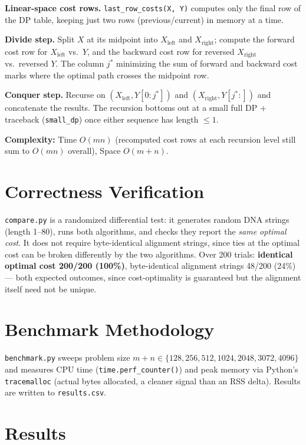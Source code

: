 \documentclass[11pt]{article}
\begin{document}
\textbf{Linear-space cost rows.} \texttt{last\_row\_costs(X, Y)} computes only
the final row of the DP table, keeping just two rows (previous/current) in
memory at a time.

\textbf{Divide step.} Split $X$ at its midpoint into $X_{\text{left}}$ and
$X_{\text{right}}$; compute the forward cost row for $X_{\text{left}}$ vs.\
$Y$, and the backward cost row for reversed $X_{\text{right}}$ vs.\ reversed
$Y$. The column $j^*$ minimizing the sum of forward and backward cost marks
where the optimal path crosses the midpoint row.

\textbf{Conquer step.} Recurse on $(X_{\text{left}}, Y[0{:}j^*])$ and
$(X_{\text{right}}, Y[j^*{:}])$ and concatenate the results. The recursion
bottoms out at a small full DP + traceback (\texttt{small\_dp}) once either
sequence has length $\le 1$.

\textbf{Complexity:} Time $O(mn)$ (recomputed cost rows at each recursion
level still sum to $O(mn)$ overall), Space $O(m+n)$.

\section{Correctness Verification}

\texttt{compare.py} is a randomized differential test: it generates random
DNA strings (length 1--80), runs both algorithms, and checks they report the
\emph{same optimal cost}. It does not require byte-identical alignment
strings, since ties at the optimal cost can be broken differently by the two
algorithms. Over 200 trials: \textbf{identical optimal cost 200/200 (100\%)},
byte-identical alignment strings 48/200 (24\%) --- both expected outcomes,
since cost-optimality is guaranteed but the alignment itself need not be
unique.

\section{Benchmark Methodology}

\texttt{benchmark.py} sweeps problem size $m+n \in \{128, 256, 512, 1024,
2048, 3072, 4096\}$ and measures CPU time (\texttt{time.perf\_counter()}) and
peak memory via Python's \texttt{tracemalloc} (actual bytes allocated, a
cleaner signal than an RSS delta). Results are written to \texttt{results.csv}.

\section{Results}
\end{document}
